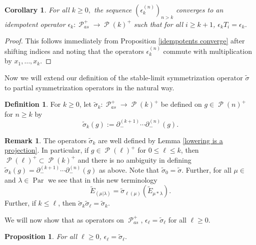 \documentclass[11pt]{article}
\newtheorem{prop}[theo]{Proposition}
\newtheorem{coro}[theo]{Corollary}
\theoremstyle{definition}
\newtheorem{defi}[theo]{Definition}
\newtheorem{rema}[theo]{Remark}
\numberwithin{equation}{section}
\DeclareMathOperator{\sP}{\mathscr{P} }
\DeclareMathOperator{\Par}{\mathrm{Par}}
\DeclareMathOperator{\Compred}{\mathrm{Comp}^{\textit{red}}}
\begin{document}
\begin{coro}\label{partial idempotents converge}
    For all $k \geq 0,$ the sequence $(\epsilon^{(n)}_k)_{n>k}$ converges to an idempotent operator $\epsilon_k: \sP_{as}^{+} \rightarrow \sP(k)^{+}$ such that for all $ i \geq k+1$, $\epsilon_k T_i = \epsilon_k$.
\end{coro}

\begin{proof}
    This follows immediately from Proposition \ref{idempotents converge} after shifting indices and noting that the operators $\epsilon^{(n)}_k$ commute with multiplication by $x_1,\ldots, x_k$.
\end{proof}

Now we will extend our definition of the stable-limit symmetrization operator $\widetilde{\sigma}$ to partial symmetrization operators in the natural way.

\begin{defi}\label{defn 12}
    For $k \geq 0$, let $\widetilde{\sigma}_k: \sP_{as}^{+} \rightarrow \sP(k)^{+}$ be defined on $g \in \sP(n)^{+}$ for $n \geq k$ by 
    \begin{equation}
        \widetilde{\sigma}_k(g):= \partial_{-}^{(k+1)}\cdots \partial_{-}^{(n)}(g).
    \end{equation}
\end{defi}

\begin{rema}
    The operators $\widetilde{\sigma}_k$ are well defined by Lemma \ref{lowering is a projection}. In particular, if $g \in \sP(\ell)^{+}$ for $0 \leq \ell \leq k$, then $\sP(\ell)^{+} \subset \sP(k)^{+}$ and there is no ambiguity in defining $\widetilde{\sigma}_k(g) = \partial_{-}^{(k+1)}\cdots \partial_{-}^{(n)}(g)$ as above. Note that $\widetilde{\sigma}_0 = \widetilde{\sigma}$. Further, for all $\mu \in \Compred$ and $\lambda \in \Par$ we see that in this new terminology 
    $$\widetilde{E}_{(\mu|\lambda)} = \widetilde{\sigma}_{\ell(\mu)}(\widetilde{E}_{\mu*\lambda}). $$ Further, if $k \leq \ell$, then $\widetilde{\sigma}_k\widetilde{\sigma}_{\ell} = \widetilde{\sigma}_k.$
\end{rema}

We will now show that as operators on $\sP_{as}^{+}$, $\epsilon_{\ell} = \widetilde{\sigma}_{\ell}$ for all ${\ell} \geq 0$.

\begin{prop}\label{idempotent = HL}
    For all $\ell \geq 0$, $\epsilon_{\ell} = \widetilde{\sigma}_{\ell} .$
\end{prop}
\end{document}
